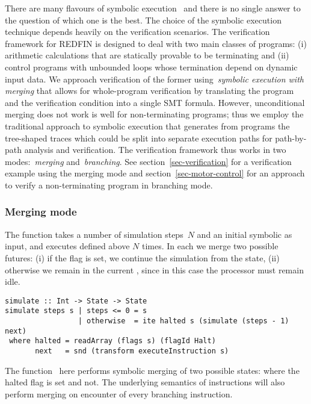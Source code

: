 There are many flavours of symbolic execution~\cite{SurveySymExec-CSUR18}
and there is no single answer to the question of which one is the best.
The choice of the symbolic execution technique depends heavily on the
verification scenarios. The verification framework for REDFIN is designed
to deal with two main classes of programs: (i) arithmetic calculations that
are statically provable to be terminating and (ii) control programs with
unbounded loops whose termination depend on dynamic input data. We approach
verification of the former using~\emph{symbolic execution with merging} that
allows for whole-program verification by translating the program and the
verification condition into a single SMT formula. However, unconditional merging
does not work is well for non-terminating programs; thus
we employ the traditional approach to symbolic execution that generates from programs
the tree-shaped traces which could be split into separate execution paths for path-by-path
analysis and verification. The verification framework thus works in two
modes:~\emph{merging} and~\emph{branching}. See section~\ref{sec-verification} for
a verification example using the merging mode and section~\ref{sec-motor-control} for
an approach to verify a non-terminating program in branching mode.

\subsubsection{Merging mode}

The function  takes a number of simulation
steps~$N$ and an initial symbolic  as input, and executes
 defined above $N$ times. In each  we
merge two possible futures: (i) if the  flag is set, we continue the
simulation from the  state, (ii) otherwise we remain in the current
, since in this case the processor must remain idle.

\begin{verbatim}
simulate :: Int -> State -> State
simulate steps s | steps <= 0 = s
                 | otherwise  = ite halted s (simulate (steps - 1) next)
 where halted = readArray (flags s) (flagId Halt)
       next   = snd (transform executeInstruction s)
\end{verbatim}

The function~ here performs symbolic merging of two possible states:
where the halted flag is set and not. The underlying semantics of instructions
will also perform merging on encounter of every branching instruction.

